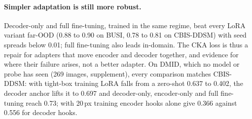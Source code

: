 \paragraph{Simpler adaptation is still more robust.}
Decoder-only and full fine-tuning, trained in the same regime, beat every LoRA variant far-OOD (0.88 to 0.90 on BUSI, 0.78 to 0.81 on CBIS-DDSM) with seed spreads below 0.01; full fine-tuning also leads in-domain. The CKA loss is thus a repair for adapters that move encoder and decoder together, and evidence for where their failure arises, not a better adapter. On DMID, which no model or probe has seen (269 images, supplement), every comparison matches CBIS-DDSM: with tight-box training LoRA falls from a zero-shot 0.637 to 0.402, the decoder anchor lifts it to 0.697 and decoder-only, encoder-only and full fine-tuning reach 0.73; with 20\,px training encoder hooks alone give 0.366 against 0.556 for decoder hooks.

